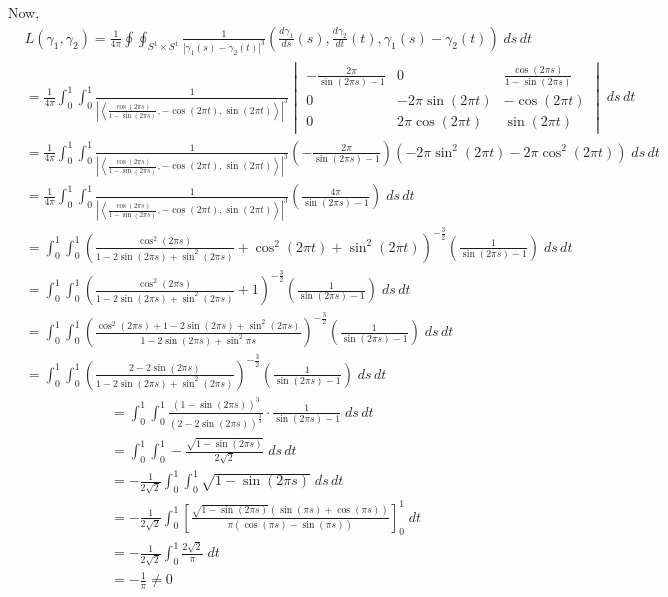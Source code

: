 \documentclass[12pt]{article}
\newcommand{\abs}[1]{\left\vert #1 \right\vert}
\newcommand{\brak}[1]{\left\langle #1 \right\rangle}
\begin{document}
        Now, 
        \begin{align*}
            &L(\gamma_1, \gamma_2) = \frac{1}{4\pi} \oint \oint_{S^1 \times S^1} \frac{1}{|\gamma_1(s) - \gamma_2(t)|^3} \left(\frac{d\gamma_1}{ds}(s), \frac{d\gamma_2}{dt}(t), \gamma_1(s) - \gamma_2(t)\right)\; ds\, dt\\ 
            &= \frac{1}{4\pi} \int_{0}^{1} \int_0^1 \frac{1}{\abs{\brak{\frac{\cos(2\pi s)}{1 - \sin(2\pi s)}, -\cos(2\pi t), \sin(2\pi t)}}^3} \begin{vmatrix}
                -\frac{2\pi}{\sin(2\pi s) - 1} & 0 & \frac{\cos(2\pi s)}{1 - \sin(2\pi s)}\\ 
                0 & -2\pi\sin(2\pi t) & -\cos(2\pi t)\\
                0 & 2\pi \cos(2\pi t) & \sin(2\pi t)
            \end{vmatrix}\; ds\, dt\\ 
            &= \frac{1}{4\pi} \int_0^1 \int_0^1 \frac{1}{\abs{\brak{\frac{\cos(2\pi s)}{1 - \sin(2\pi s)}, -\cos(2\pi t), \sin(2\pi t)}}^3} \left(-\frac{2\pi}{\sin(2\pi s) - 1}\right)\left(-2\pi \sin^2(2\pi t) - 2\pi \cos^2(2\pi t)\right)\; ds\, dt\\ 
            &= \frac{1}{4\pi} \int_0^1 \int_0^1 \frac{1}{\abs{\brak{\frac{\cos(2\pi s)}{1 - \sin(2\pi s)}, -\cos(2\pi t), \sin(2\pi t)}}^3} \left(\frac{4\pi}{\sin(2\pi s) - 1}\right)\; ds\, dt\\
            &= \int_0^1 \int_0^1 \left(\frac{\cos^2(2\pi s)}{1 - 2\sin(2\pi s) + \sin^2(2\pi s)}  + \cos^2(2\pi t) + \sin^2(2\pi t)\right)^{-\frac{3}{2}} \left(\frac{1}{\sin(2\pi s) - 1}\right)\; ds\, dt\\ 
            &= \int_0^1 \int_0^1 \left(\frac{\cos^2(2\pi s)}{1 - 2\sin(2\pi s) + \sin^2(2\pi s)} + 1\right)^{-\frac{3}{2}} \left(\frac{1}{\sin(2\pi s) - 1}\right)\; ds\, dt\\ 
            &= \int_0^1 \int_0^1 \left(\frac{\cos^2(2\pi s) + 1 - 2\sin(2\pi s) + \sin^2(2\pi s)}{1 - 2\sin(2\pi s) + \sin^2 \pi s}\right)^{-\frac{3}{2}} \left(\frac{1}{\sin(2\pi s) - 1}\right)\; ds\, dt\\
            &= \int_0^1 \int_0^1 \left(\frac{2 - 2\sin(2\pi s)}{1 - 2\sin(2\pi s) + \sin^2(2\pi s)}\right)^{-\frac{3}{2}} \left(\frac{1}{\sin(2\pi s) - 1}\right)\; ds\, dt
        \end{align*} 
        \begin{align*}
            &= \int_0^1 \int_0^1 \frac{(1 - \sin(2\pi s))^3}{(2 - 2\sin(2\pi s))^{\frac{3}{2}}} \cdot \frac{1}{\sin(2\pi s) - 1}\; ds\, dt\\ 
            &= \int_0^1 \int_0^1 -\frac{\sqrt{1 - \sin(2\pi s)}}{2\sqrt 2}\; ds\, dt\\ 
            &= -\frac{1}{2\sqrt 2} \int_0^1 \int_0^1 \sqrt{1 - \sin(2\pi s)}\; ds\, dt\\
            &= -\frac{1}{2\sqrt 2} \int_0^1 \left[\frac{\sqrt{1 - \sin(2\pi s)} (\sin(\pi s) + \cos(\pi s))}{\pi(\cos(\pi s) - \sin(\pi s))}\right]_0^1\; dt\\ 
            &= -\frac{1}{2\sqrt 2}\int_0^1 \frac{2\sqrt 2}{\pi} \; dt\\ 
            &= -\frac{1}{\pi} \neq 0
        \end{align*}
\end{document}

